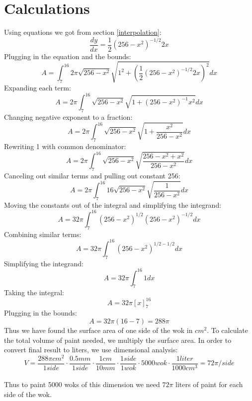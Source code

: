 \documentclass[a4paper, 12pt]{article}
\begin{document}
	\section{Calculations} 
		Using equations we got from section \ref{interpolation}: $$\frac{dy}{dx}=\frac{1}{2}{(256-x^2)}^{-1/2} 2x$$
		Plugging in the equation and the bounds:$$A = \int_7^{16} 2\pi \sqrt{256-x^2}\sqrt{1^2+{(\frac{1}{2}{(256-x^2)}^{-1/2} 2x)}^2}dx$$
		Expanding each term:$$A =2\pi \int_7^{16} \sqrt{256-x^2}\sqrt{1+{(256-x^2)}^{-1} x^2}dx$$
		Changing negative exponent to a fraction:$$A =2\pi \int_7^{16} \sqrt{256-x^2}\sqrt{1+\frac{x^2}{256-x^2}}dx$$
		Rewriting 1 with common denominator:$$A =2\pi \int_7^{16} \sqrt{256-x^2}\sqrt{\frac{256-x^2+x^2}{256-x^2}}dx$$
		Canceling out similar terms and pulling out constant 256:$$A =2\pi \int_7^{16} 16\sqrt{256-x^2} \sqrt{\frac{1}{256-x^2}}dx$$
		Moving the constants out of the integral and simplifying the integrand:$$A =32\pi \int_7^{16}{(256-x^2)}^{1/2} {(256-x^2)}^{-1/2}dx$$
		Combining similar terms:$$A =32\pi \int_7^{16}{(256-x^2)}^{1/2-1/2} dx$$
		Simplifying the integrand:$$A =32\pi \int_7^{16}1 dx$$
		Taking the integral:$$A =32\pi \left[x\right]_7^{16}$$
		Plugging in the bounds:$$A =32\pi {(16-7)}=288\pi$$
		Thus we have found the surface area of one side of the wok in $cm^2$. To calculate the total volume of paint needed, we multiply the surface area. In order to convert final result to liters, we use dimensional analysis:$$V=\frac{288\pi cm^2}{1 side}\cdot\frac{ 0.5 mm}{1 side} \cdot\frac{1 cm}{10 mm}\cdot\frac{1 side}{1 wok}\cdot5000 wok\cdot\frac{1 liter}{1000cm^3}=72\pi/side$$\\
		Thus to paint 5000 woks of this dimension we need $72\pi$ liters of paint for each side of the wok.
\end{document}
